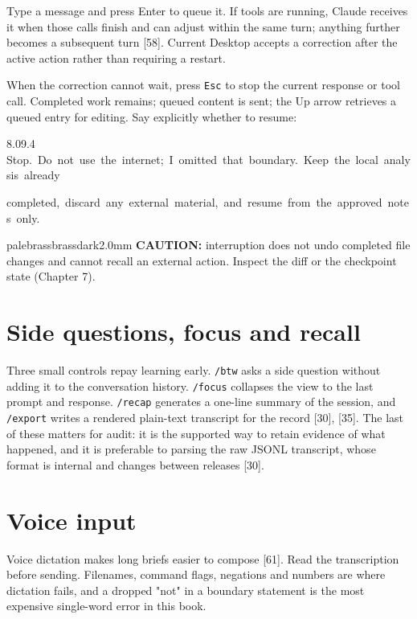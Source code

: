 \documentclass[11pt,a4paper,twoside,openany]{book}
\newcommand{\cl}[1]{\noindent\mbox{#1}\par}
\begin{document}
Type a message and press Enter to queue it. If tools are running, Claude receives it when those calls finish and can adjust within the same turn; anything further becomes a subsequent turn [58]. Current Desktop accepts a correction after the active action rather than requiring a restart.


When the correction cannot wait, press \texttt{Esc} to stop the current response or tool call. Completed work remains; queued content is sent; the Up arrow retrieves a queued entry for editing. Say explicitly whether to resume:


\begin{codeblock}{8.0}{9.4}
\cl{Stop.~Do~not~use~the~internet;~I~omitted~that~boundary.~Keep~the~local~analysis~already}
\cl{completed,~discard~any~external~material,~and~resume~from~the~approved~notes~only.}
\end{codeblock}

\begin{calloutbox}{palebrass}{brassdark}{2.0mm}
\textbf{CAUTION:} interruption does not undo completed file changes and cannot recall an external action. Inspect the diff or the checkpoint state (Chapter 7).
\end{calloutbox}

\FloatBarrier
\setcounter{section}{3}
\section{Side questions, focus and recall}

Three small controls repay learning early. \texttt{/\allowbreak{}btw} asks a side question without adding it to the conversation history. \texttt{/\allowbreak{}focus} collapses the view to the last prompt and response. \texttt{/\allowbreak{}recap} generates a one-line summary of the session, and \texttt{/\allowbreak{}export} writes a rendered plain-text transcript for the record [30], [35]. The last of these matters for audit: it is the supported way to retain evidence of what happened, and it is preferable to parsing the raw JSONL transcript, whose format is internal and changes between releases [30].


\FloatBarrier
\setcounter{section}{4}
\section{Voice input}

Voice dictation makes long briefs easier to compose [61]. Read the transcription before sending. Filenames, command flags, negations and numbers are where dictation fails, and a dropped "not" in a boundary statement is the most expensive single-word error in this book.
\end{document}
